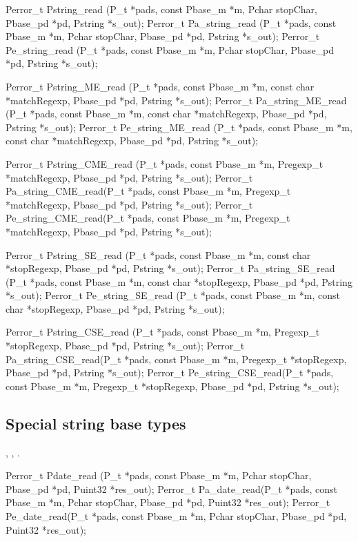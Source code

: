 \begin{tinycodeaux}{\leftmargin=0in}
Perror_t Pstring_read      (P_t *pads, const Pbase_m *m, Pchar stopChar,
			    Pbase_pd *pd, Pstring *s_out);
Perror_t Pa_string_read    (P_t *pads, const Pbase_m *m, Pchar stopChar,
			    Pbase_pd *pd, Pstring *s_out);
Perror_t Pe_string_read    (P_t *pads, const Pbase_m *m, Pchar stopChar,
			    Pbase_pd *pd, Pstring *s_out);

Perror_t Pstring_ME_read   (P_t *pads, const Pbase_m *m, const char *matchRegexp,
			    Pbase_pd *pd, Pstring *s_out);
Perror_t Pa_string_ME_read (P_t *pads, const Pbase_m *m, const char *matchRegexp,
			    Pbase_pd *pd, Pstring *s_out);
Perror_t Pe_string_ME_read (P_t *pads, const Pbase_m *m, const char *matchRegexp,
			    Pbase_pd *pd, Pstring *s_out);

Perror_t Pstring_CME_read  (P_t *pads, const Pbase_m *m, Pregexp_t *matchRegexp,
			    Pbase_pd *pd, Pstring *s_out);
Perror_t Pa_string_CME_read(P_t *pads, const Pbase_m *m, Pregexp_t *matchRegexp,
			    Pbase_pd *pd, Pstring *s_out);
Perror_t Pe_string_CME_read(P_t *pads, const Pbase_m *m, Pregexp_t *matchRegexp,
			    Pbase_pd *pd, Pstring *s_out);

Perror_t Pstring_SE_read   (P_t *pads, const Pbase_m *m, const char *stopRegexp,
			    Pbase_pd *pd, Pstring *s_out);
Perror_t Pa_string_SE_read (P_t *pads, const Pbase_m *m, const char *stopRegexp,
			    Pbase_pd *pd, Pstring *s_out);
Perror_t Pe_string_SE_read (P_t *pads, const Pbase_m *m, const char *stopRegexp,
			    Pbase_pd *pd, Pstring *s_out);

Perror_t Pstring_CSE_read  (P_t *pads, const Pbase_m *m, Pregexp_t *stopRegexp,
			    Pbase_pd *pd, Pstring *s_out);
Perror_t Pa_string_CSE_read(P_t *pads, const Pbase_m *m, Pregexp_t *stopRegexp,
			    Pbase_pd *pd, Pstring *s_out);
Perror_t Pe_string_CSE_read(P_t *pads, const Pbase_m *m, Pregexp_t *stopRegexp,
			    Pbase_pd *pd, Pstring *s_out);
\end{tinycodeaux}

\subsection{Special string base types}

\aedBegin{}
, , .
\aedEnd{}

\begin{tinycodeaux}{\leftmargin=0in}
Perror_t Pdate_read  (P_t *pads, const Pbase_m *m, Pchar stopChar,
		      Pbase_pd *pd, Puint32 *res_out);
Perror_t Pa_date_read(P_t *pads, const Pbase_m *m, Pchar stopChar,
		      Pbase_pd *pd, Puint32 *res_out);
Perror_t Pe_date_read(P_t *pads, const Pbase_m *m, Pchar stopChar,
		      Pbase_pd *pd, Puint32 *res_out);
\end{tinycodeaux}

